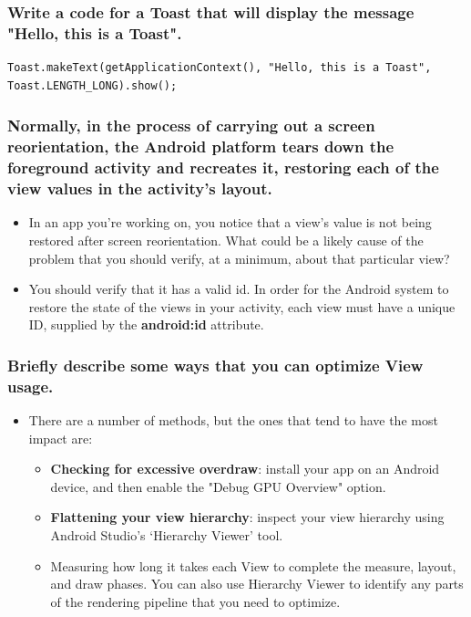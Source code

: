 \documentclass[9pt, b5paper]{article}
\begin{document}
\subsubsection{Write a code for a Toast that will display the message "Hello, this is a Toast".}
\label{sec-1-7-4}
\begin{verbatim}
Toast.makeText(getApplicationContext(), "Hello, this is a Toast", Toast.LENGTH_LONG).show();
\end{verbatim}

\subsubsection{Normally, in the process of carrying out a screen reorientation, the Android platform tears down the foreground activity and recreates it, restoring each of the view values in the activity's layout.}
\label{sec-1-7-5}
\begin{itemize}
\item In an app you're working on, you notice that a view's value is not being restored after screen reorientation. What could be a likely cause of the problem that you should verify, at a minimum, about that particular view?
\item You should verify that it has a valid id. In order for the Android system to restore the state of the views in your activity, each view must have a unique ID, supplied by the \textbf{android:id} attribute.
\end{itemize}

\subsubsection{Briefly describe some ways that you can optimize View usage.}
\label{sec-1-7-6}
\begin{itemize}
\item There are a number of methods, but the ones that tend to have the most impact are:
\begin{itemize}
\item \textbf{Checking for excessive overdraw}: install your app on an Android device, and then enable the "Debug GPU Overview" option.
\item \textbf{Flattening your view hierarchy}: inspect your view hierarchy using Android Studio's ‘Hierarchy Viewer' tool.
\item Measuring how long it takes each View to complete the measure, layout, and draw phases. You can also use Hierarchy Viewer to identify any parts of the rendering pipeline that you need to optimize.
\end{itemize}
\end{itemize}
\end{document}
